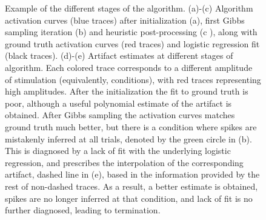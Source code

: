 \documentclass[12pt,letterpaper,fleqn]{article}
\begin{document}
\begin{figure}[ht!]
\caption{Example of the different stages of the algorithm. (a)-(c) Algorithm activation curves (blue traces) after initialization (a), first Gibbs sampling iteration (b) and heuristic post-processing (c ), along with ground truth activation curves (red traces) and logistic regression fit (black traces). (d)-(e) Artifact estimates at different stages of algorithm. Each colored trace corresponds to a different amplitude of stimulation (equivalently, conditions), with red traces representing high amplitudes. After the initialization the fit to ground truth is poor, although a useful polynomial estimate of the artifact is obtained. After Gibbs sampling the activation curves matches ground truth much better, but there is a condition where spikes are mistakenly inferred at all trials, denoted by the green circle in (b). This is diagnosed by a lack of fit with the underlying logistic regression, and prescribes the interpolation of the corresponding artifact, dashed line in (e), based in the information provided by the rest of non-dashed traces. As a result, a better estimate is obtained, spikes are no longer inferred at that condition, and lack of fit is no further diagnosed, leading to termination.}
\label{fig:traces}
\end{figure}

  



    
\end{document}
